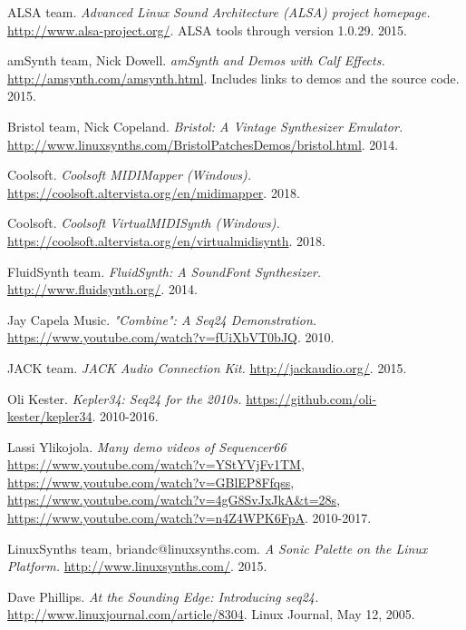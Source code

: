 \begin{thebibliography}{99}

   ALSA team.
   \emph{Advanced Linux Sound Architecture (ALSA) project homepage.}
   \url{http://www.alsa-project.org/}.
   ALSA tools through version 1.0.29.
   2015.

   amSynth team, Nick Dowell.
   \emph{amSynth and Demos with Calf Effects.}
   \url{http://amsynth.com/amsynth.html}.
   Includes links to demos and the source code.
   2015.

   Bristol team, Nick Copeland.
   \emph{Bristol: A Vintage Synthesizer Emulator.}
   \url{http://www.linuxsynths.com/BristolPatchesDemos/bristol.html}.
   2014.

   Coolsoft.
   \emph{Coolsoft MIDIMapper (Windows).}
   \url{https://coolsoft.altervista.org/en/midimapper}.
   2018.

   Coolsoft.
   \emph{Coolsoft VirtualMIDISynth (Windows).}
   \url{https://coolsoft.altervista.org/en/virtualmidisynth}.
   2018.

   FluidSynth team.
   \emph{FluidSynth: A SoundFont Synthesizer.}
   \url{http://www.fluidsynth.org/}.
   2014.

   Jay Capela Music.
   \emph{"Combine": A Seq24 Demonstration.}
   \url{https://www.youtube.com/watch?v=fUiXbVT0bJQ}.
   2010.

   JACK team.
   \emph{JACK Audio Connection Kit.}
   \url{http://jackaudio.org/}.
   2015.

   Oli Kester.
   \emph{Kepler34: Seq24 for the 2010s.}
   \url{https://github.com/oli-kester/kepler34}.
   2010-2016.

   Lassi Ylikojola.
   \emph{Many demo videos of Sequencer66}
   \url{https://www.youtube.com/watch?v=YStYVjFv1TM},
   \url{https://www.youtube.com/watch?v=GBlEP8Ffqss},
   \url{https://www.youtube.com/watch?v=4gG8SvJxJkA&t=28s},
   \url{https://www.youtube.com/watch?v=n4Z4WPK6FpA}.
   2010-2017.

   LinuxSynths team, briandc@linuxsynths.com.
   \emph{A Sonic Palette on the Linux Platform.}
   \url{http://www.linuxsynths.com/}.
   2015.

   Dave Phillips.
   \emph{At the Sounding Edge: Introducing seq24.}
   \url{http://www.linuxjournal.com/article/8304}.
   Linux Journal, May 12, 2005.


\end{thebibliography}
